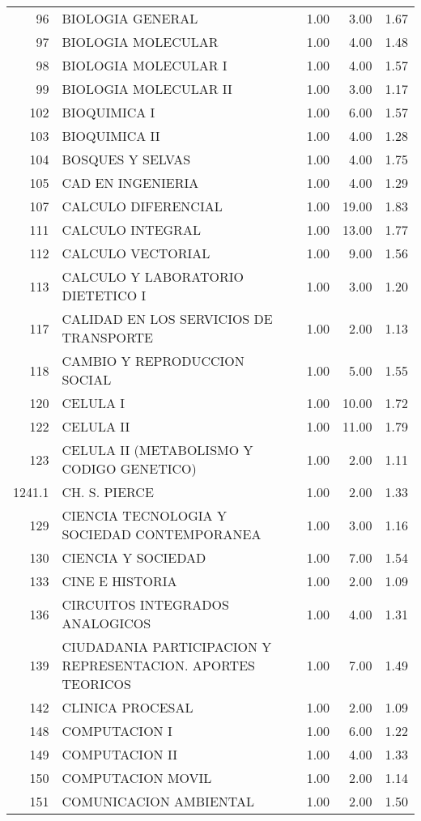 \begin{table}[ht]
\begin{tabular}{rlrrr}
  96 & BIOLOGIA GENERAL & 1.00 & 3.00 & 1.67 \\ 
  97 & BIOLOGIA MOLECULAR & 1.00 & 4.00 & 1.48 \\ 
  98 & BIOLOGIA MOLECULAR I & 1.00 & 4.00 & 1.57 \\ 
  99 & BIOLOGIA MOLECULAR II & 1.00 & 3.00 & 1.17 \\ 
  102 & BIOQUIMICA I & 1.00 & 6.00 & 1.57 \\ 
  103 & BIOQUIMICA II & 1.00 & 4.00 & 1.28 \\ 
  104 & BOSQUES Y SELVAS & 1.00 & 4.00 & 1.75 \\ 
  105 & CAD EN INGENIERIA & 1.00 & 4.00 & 1.29 \\ 
  107 & CALCULO DIFERENCIAL & 1.00 & 19.00 & 1.83 \\ 
  111 & CALCULO INTEGRAL & 1.00 & 13.00 & 1.77 \\ 
  112 & CALCULO VECTORIAL & 1.00 & 9.00 & 1.56 \\ 
  113 & CALCULO Y LABORATORIO DIETETICO I & 1.00 & 3.00 & 1.20 \\ 
  117 & CALIDAD EN LOS SERVICIOS DE TRANSPORTE & 1.00 & 2.00 & 1.13 \\ 
  118 & CAMBIO Y REPRODUCCION SOCIAL & 1.00 & 5.00 & 1.55 \\ 
  120 & CELULA I & 1.00 & 10.00 & 1.72 \\ 
  122 & CELULA II & 1.00 & 11.00 & 1.79 \\ 
  123 & CELULA II (METABOLISMO Y CODIGO GENETICO) & 1.00 & 2.00 & 1.11 \\ 
  1241.1 & CH. S. PIERCE & 1.00 & 2.00 & 1.33 \\ 
  129 & CIENCIA TECNOLOGIA Y SOCIEDAD CONTEMPORANEA & 1.00 & 3.00 & 1.16 \\ 
  130 & CIENCIA Y SOCIEDAD & 1.00 & 7.00 & 1.54 \\ 
  133 & CINE E HISTORIA & 1.00 & 2.00 & 1.09 \\ 
  136 & CIRCUITOS INTEGRADOS ANALOGICOS & 1.00 & 4.00 & 1.31 \\ 
  139 & CIUDADANIA PARTICIPACION Y REPRESENTACION. APORTES TEORICOS & 1.00 & 7.00 & 1.49 \\ 
  142 & CLINICA PROCESAL & 1.00 & 2.00 & 1.09 \\ 
  148 & COMPUTACION I & 1.00 & 6.00 & 1.22 \\ 
  149 & COMPUTACION II & 1.00 & 4.00 & 1.33 \\ 
  150 & COMPUTACION MOVIL & 1.00 & 2.00 & 1.14 \\ 
  151 & COMUNICACION AMBIENTAL & 1.00 & 2.00 & 1.50 \\ 

\end{tabular}
\end{table}
